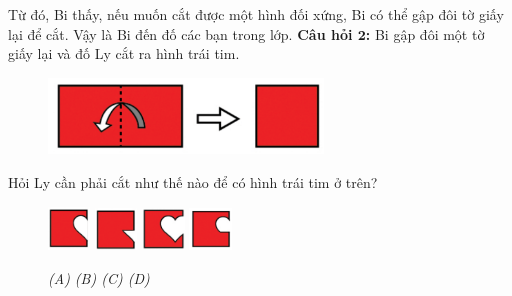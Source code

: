 Từ đó, Bi thấy, nếu muốn cắt được một hình đối xứng, Bi có thể gập đôi tờ giấy lại để cắt. Vậy là Bi đến đố các bạn trong lớp.
\vskip 0.1cm
\textbf{Câu hỏi $\pmb{2}$:} Bi gập đôi một tờ giấy lại và đố Ly cắt ra hình trái tim.
\begin{figure}[H]
	\centering
	\captionsetup{labelformat=empty}
	\vspace*{-5pt}
	\captionsetup{justification=centering}
	\includegraphics[width =0.65\textwidth]{cat-4}
	\vspace*{-10pt}
\end{figure}
Hỏi Ly cần phải cắt như thế nào để có hình trái tim ở trên?
\begin{figure}[H]
	\centering
	\captionsetup{labelformat=empty}
	\vspace*{-4pt}
	\captionsetup{justification=centering}
	\includegraphics[width =0.1\textwidth]{cat-4a}
	\hfill
	\includegraphics[width =0.1\textwidth]{cat-4b}
	\hfill
	\includegraphics[width =0.1\textwidth]{cat-4c}
	\hfill
	\includegraphics[width =0.1\textwidth]{cat-4d}
	\vspace*{-5pt}
	\caption{\small \it (A)\hspace*{75pt} (B)\hspace*{75pt} (C) \hspace*{75pt} (D)}
	\vspace*{-10pt}
\end{figure}
